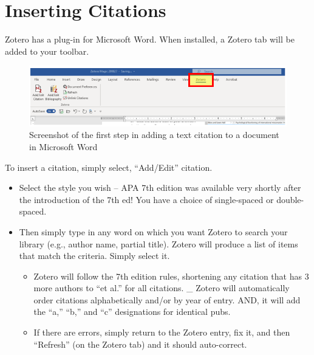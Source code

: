\documentclass[
  english,
]{book}
\providecommand{\tightlist}{%
  \setlength{\itemsep}{0pt}\setlength{\parskip}{0pt}}
\begin{document}
\hypertarget{inserting-citations}{%
\section{Inserting Citations}\label{inserting-citations}}

Zotero has a plug-in for Microsoft Word. When installed, a Zotero tab will be added to your toolbar.

\begin{figure}
\centering
\includegraphics{images/Zotero/InsertingCitations.png}
\caption{Screenshot of the first step in adding a text citation to a document in Microsoft Word}
\end{figure}

To insert a citation, simply select, ``Add/Edit'' citation.

\begin{itemize}
\tightlist
\item
  Select the style you wish -- APA 7th edition was available very shortly after the introduction of the 7th ed! You have a choice of single-spaced or double-spaced.
\item
  Then simply type in any word on which you want Zotero to search your library (e.g., author name, partial title). Zotero will produce a list of items that match the criteria. Simply select it.

  \begin{itemize}
  \tightlist
  \item
    Zotero will follow the 7th edition rules, shortening any citation that has 3 more authors to ``et al.'' for all citations.
    \_ Zotero will automatically order citations alphabetically and/or by year of entry. AND, it will add the ``a,'' ``b,'' and ``c'' designations for identical pubs.
  \item
    If there are errors, simply return to the Zotero entry, fix it, and then ``Refresh'' (on the Zotero tab) and it should auto-correct.
  \end{itemize}
\end{itemize}
\end{document}
